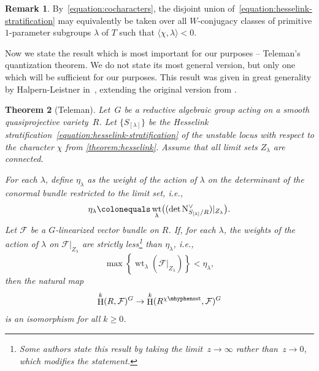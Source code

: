\documentclass[JEP,XML,SOM,Unicode,NoEqCountersInSection,published]{cedram}
\theoremstyle{plain}
\newtheorem{theorem}{Theorem}[section]
\theoremstyle{definition}
\newtheorem{remark}[theorem]{Remark}
\DeclareMathOperator\HH{H}
\DeclareMathOperator\weight{wt}
\newcommand\normal{\ensuremath{\mathrm{N}}}
\newcommand\semistable{\ensuremath{\mhyphen\mathrm{sst}}}
\begin{document}
\begin{remark}
\label{remark:indexing-set}
By~\eqref{equation:cocharacters},
the disjoint union of~\eqref{equation:hesselink-stratification} may equivalently be taken over
all $W$-conjugacy classes of primitive $1$-parameter subgroups $\lambda$ of $T$
such that $\langle \chi,\lambda \rangle < 0$.
\end{remark}

Now we state the result which is most important for our purposes -- Teleman's quantization theorem.
We do not state its most general version, but only one which will be sufficient for our purposes.
This result was given in great generality by Halpern-Leistner in~\cite[Th.\,3.29]{MR3327537},
extending the original version from \cite[Prop.\,2.11 \& Rem.\,2.12(i)]{MR1792291}.

\begin{theorem}[Teleman]
\label{theorem:teleman-quantization}
Let~$G$ be a reductive algebraic group
acting on a smooth quasiprojective variety~$R$.
Let $\{S_{[\lambda]}\}$ be the Hesselink stratification~\eqref{equation:hesselink-stratification} of the unstable locus
with respect to the character $\chi$ from \cref{theorem:hesselink}.
Assume that all limit sets $Z_\lambda$ are connected.

For each $\lambda$, define $\eta_\lambda$ as the weight of the action of $\lambda$
on the determinant of the conormal bundle restricted to the limit set, i.e.,
\begin{equation}
\label{equation:eta-lambda}
\eta_\lambda\colonequals\weight_\lambda \bigl( (\det \normal_{S_{[\lambda]}/R}^\vee) |_{Z_\lambda} \bigr).
\end{equation}
Let $\mathcal{F}$ be a $G$-linearized vector bundle on $R$.
If, for each $\lambda$, the weights of the action of $\lambda$ on $\mathcal{F}|_{Z_\lambda}$
are strictly less\footnote{Some authors state this result
by taking the limit~$z\to\infty$ rather than~$z\to0$,
which modifies the statement.}
than $\eta_\lambda$,
i.e.,
\begin{equation}
\label{equation:teleman-inequality-general}
\max\left\{ \weight_\lambda\left( \mathcal{F}|_{Z_\lambda} \right) \right\}<\eta_\lambda,
\end{equation}
then the natural map
\begin{equation*}
\HH^k(R,\mathcal{F})^G \to \HH^k(R^{\chi\semistable},\mathcal{F})^G
\end{equation*}
is an isomorphism for all $k \geq 0$.
\end{theorem}
\end{document}
